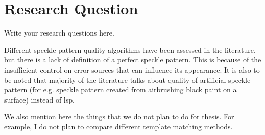 \chapter{Research Question}\label{chap:research_question}

Write your research questions here.

Different speckle pattern quality algorithms have been assessed in the literature, but there is a lack of definition of a perfect speckle pattern. This is because of the insufficient control on error sources that can influence its appearance. It is also to be noted that majority of the literature talks about quality of artificial speckle pattern (for e.g. speckle pattern created from airbrushing black paint on a surface) instead of \gls{lsp}.

We also mention here the things that we do not plan to do for thesis. For example, I do not plan to compare different template matching methods. 